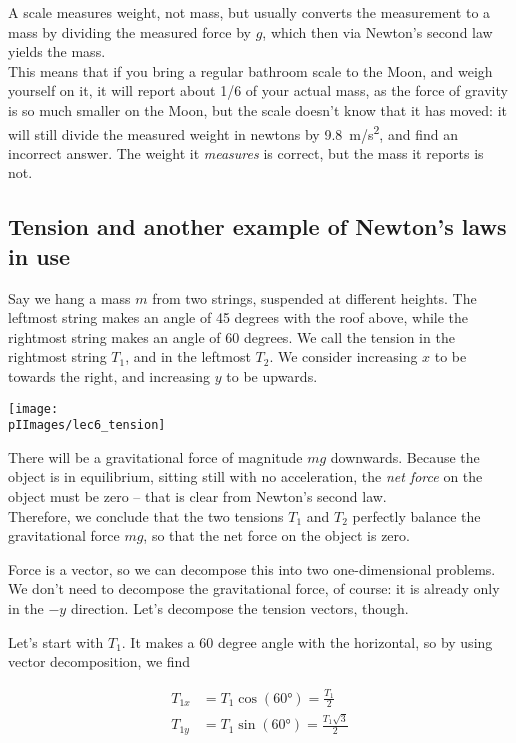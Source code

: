 A scale measures weight, not mass, but usually converts the measurement to a mass by dividing the measured force by $g$, which then via Newton's second law yields the mass.\\
This means that if you bring a regular bathroom scale to the Moon, and weigh yourself on it, it will report about 1/6 of your actual mass, as the force of gravity is so much smaller on the Moon, but the scale doesn't know that it has moved: it will still divide the measured weight in newtons by \SI{9.8}{m/s^2}, and find an incorrect answer. The weight it \emph{measures} is correct, but the mass it reports is not.

\subsection{Tension and another example of Newton's laws in use}

Say we hang a mass $m$ from two strings, suspended at different heights. The leftmost string makes an angle of 45 degrees with the roof above, while the rightmost string makes an angle of 60 degrees. We call the tension in the rightmost string $T_1$, and in the leftmost $T_2$. We consider increasing $x$ to be towards the right, and increasing $y$ to be upwards.

\begin{center}
\texttt{[image: \\pIImages/lec6\_tension]}
\end{center}

There will be a gravitational force of magnitude $m g$ downwards. Because the object is in equilibrium, sitting still with no acceleration, the \emph{net force} on the object must be zero -- that is clear from Newton's second law.\\
Therefore, we conclude that the two tensions $T_1$ and $T_2$ perfectly balance the gravitational force $m g$, so that the net force on the object is zero.

Force is a vector, so we can decompose this into two one-dimensional problems. We don't need to decompose the gravitational force, of course: it is already only in the $-y$ direction. Let's decompose the tension vectors, though.

Let's start with $T_1$. It makes a 60 degree angle with the horizontal, so by using vector decomposition, we find

\begin{align}
T_{1x} &= T_1 \cos(\ang{60}) = \frac{T_1}{2}\\
T_{1y} &= T_1 \sin(\ang{60}) = \frac{T_1 \sqrt{3}}{2}
\end{align}

